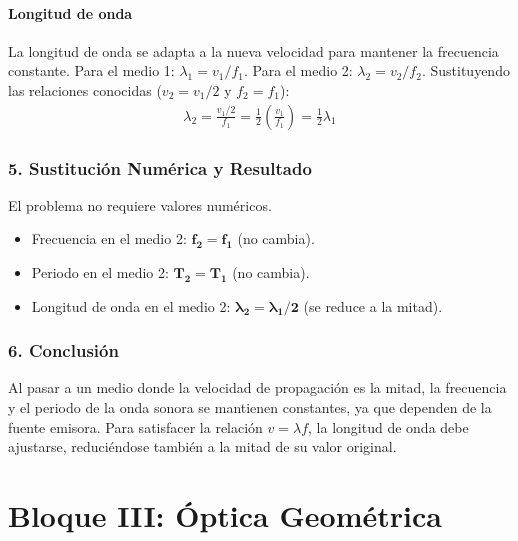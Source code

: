 \paragraph{Longitud de onda}
La longitud de onda se adapta a la nueva velocidad para mantener la frecuencia constante.
Para el medio 1: $\lambda_1 = v_1 / f_1$.
Para el medio 2: $\lambda_2 = v_2 / f_2$.
Sustituyendo las relaciones conocidas ($v_2 = v_1/2$ y $f_2 = f_1$):
\begin{gather}
    \lambda_2 = \frac{v_1/2}{f_1} = \frac{1}{2} \left(\frac{v_1}{f_1}\right) = \frac{1}{2} \lambda_1
\end{gather}

\subsubsection*{5. Sustitución Numérica y Resultado}
El problema no requiere valores numéricos.
\begin{cajaresultado}
\begin{itemize}
    \item Frecuencia en el medio 2: $\boldsymbol{f_2 = f_1}$ (no cambia).
    \item Periodo en el medio 2: $\boldsymbol{T_2 = T_1}$ (no cambia).
    \item Longitud de onda en el medio 2: $\boldsymbol{\lambda_2 = \lambda_1 / 2}$ (se reduce a la mitad).
\end{itemize}
\end{cajaresultado}

\subsubsection*{6. Conclusión}
\begin{cajaconclusion}
Al pasar a un medio donde la velocidad de propagación es la mitad, la frecuencia y el periodo de la onda sonora se mantienen constantes, ya que dependen de la fuente emisora. Para satisfacer la relación $v = \lambda f$, la longitud de onda debe ajustarse, reduciéndose también a la mitad de su valor original.
\end{cajaconclusion}
\newpage

\section{Bloque III: Óptica Geométrica}
\label{sec:optica_2017_jun_ord}

